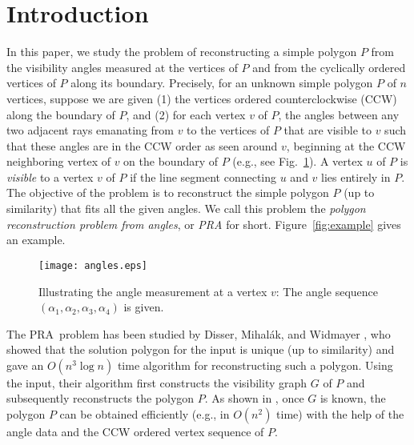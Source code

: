 \documentclass[11pt]{article}
\def\pra{PRA}
\begin{document}
\section{Introduction}
\label{sec:intro}
In this paper, we study the problem of reconstructing a simple polygon $P$
from the visibility angles measured at the vertices of $P$ and
from the cyclically ordered vertices of $P$ along its boundary. 
Precisely, for an unknown simple polygon
$P$ of $n$ vertices, suppose we are given (1) the vertices ordered 
counterclockwise (CCW) along the boundary 
of $P$, and (2) for each vertex $v$ of $P$, the angles
between any two adjacent rays emanating from $v$ to the vertices of
$P$ that are visible to $v$ such that these angles
are in the CCW order as seen around $v$, beginning
at the CCW neighboring vertex of $v$ on the boundary of $P$ (e.g., see
Fig.~\ref{fig:angles}). 
A vertex $u$ of $P$ is {\em visible} to a vertex $v$ of $P$ if the
line segment connecting $u$ and $v$ lies entirely in $P$.
The objective of the problem is to reconstruct the simple polygon $P$ (up
to similarity) that fits all the
given angles. We call this problem the {\em polygon
reconstruction problem from angles}, or {\em PRA} for short. 
Figure~\ref{fig:example} gives an example. 




\begin{figure}[t]
\begin{minipage}[t]{\linewidth}
\begin{center}
\texttt{[image: angles.eps]}
\caption{\footnotesize Illustrating the angle measurement at a
vertex $v$: The angle sequence $(\alpha_1,\alpha_2,\alpha_3,\alpha_4)$
is given. 
}\label{fig:angles}
\end{center}
\end{minipage}
\end{figure}

The \pra\ problem has been studied by Disser, Mihal\'ak, and Widmayer 
\cite{ref:DisserRe10}, who showed that the solution polygon 
for the input is unique (up to similarity) and gave an $O(n^3\log n)$ 
time algorithm for reconstructing such a polygon. Using the input, 
their algorithm first constructs the visibility graph $G$ of $P$ and
subsequently reconstructs the polygon $P$. As shown in 
\cite{ref:DisserRe10}, once $G$ is known, the polygon $P$ can be 
obtained efficiently (e.g., in $O(n^2)$ time) with the help of the angle data 
and the CCW ordered vertex sequence of $P$. 
\end{document}
